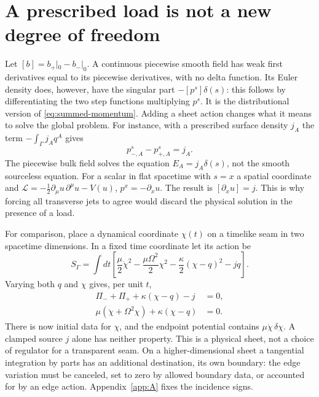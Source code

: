 \section{A prescribed load is not a new degree of freedom}
Let $[b]=b_+|_0-b_-|_0$. A continuous piecewise smooth field has weak first derivatives equal to its piecewise derivatives, with no delta function. Its Euler density does, however, have the singular part $-[p^s]\delta(s)$: this follows by differentiating the two step functions multiplying $p^s$. It is the distributional version of \eqref{eq:summed-momentum}. Adding a sheet action changes what it means to solve the global problem. For instance, with a prescribed surface density $j_A$ the term $-\int_\Gamma j_A q^A$ gives
\[
 p_{-,A}^s-p_{+,A}^s=j_A .
\]
The piecewise bulk field solves the equation $E_A=j_A\delta(s)$, not the smooth sourceless equation. For a scalar in flat spacetime with $s=x$ a spatial coordinate and $\mathcal L=-\tfrac12\partial_\mu u\,\partial^\mu u-V(u)$, $p^x=-\partial_x u$. The result is $[\partial_x u]=j$. This is why forcing all transverse jets to agree would discard the physical solution in the presence of a load.

For comparison, place a dynamical coordinate $\chi(t)$ on a timelike seam in two spacetime dimensions. In a fixed time coordinate let its action be
\[
 S_\Gamma=\int dt\left[\frac{\mu}{2}\dot\chi^2-\frac{\mu\Omega^2}{2}\chi^2-\frac{\kappa}{2}(\chi-q)^2-jq\right].
\]
Varying both $q$ and $\chi$ gives, per unit $t$,
\begin{align*}
 \Pi_-+\Pi_++\kappa(\chi-q)-j&=0,\\
 \mu(\ddot\chi+\Omega^2\chi)+\kappa(\chi-q)&=0 .
\end{align*}
There is now initial data for $\chi$, and the endpoint potential contains $\mu\dot\chi\,\delta\chi$. A clamped source $j$ alone has neither property. This is a physical sheet, not a choice of regulator for a transparent seam. On a higher-dimensional sheet a tangential integration by parts has an additional destination, its own boundary: the edge variation must be canceled, set to zero by allowed boundary data, or accounted for by an edge action. Appendix~\ref{app:A} fixes the incidence signs.

